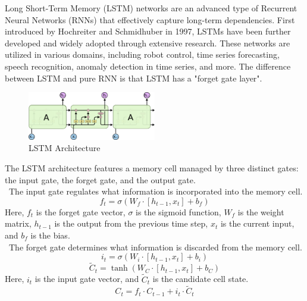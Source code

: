 \documentclass{ieeeojies}
\begin{document}
Long Short-Term Memory (LSTM) networks are an advanced type of Recurrent Neural Networks (RNNs) that effectively capture long-term dependencies. First introduced by Hochreiter and Schmidhuber in 1997, LSTMs have been further developed and widely adopted through extensive research. These networks are utilized in various domains, including robot control, time series forecasting, speech recognition, anomaly detection in time series, and more.
The difference between LSTM and pure RNN is that LSTM has a "forget gate layer". \\

\begin{figure}[H]
    \centering
    \includegraphics[width=0.5\textwidth]{bibliography/Algorithm Structure/LSTM Architecture.png}
    \caption{LSTM Architecture}
    \label{fig:1}
\end{figure}
The LSTM architecture features a memory cell managed by three distinct gates: the input gate, the forget gate, and the output gate. \\
 \indent\textbullet\ The input gate regulates what information is incorporated into the memory cell. \\
 \begin{equation}
    f_t = \sigma(W_f \cdot [h_{t-1}, x_t] + b_f)
 \end{equation}
Here, \( f_t \) is the forget gate vector, \( \sigma \) is the sigmoid function, \( W_f \) is the weight matrix, \( h_{t-1} \) is the output from the previous time step, \( x_t \) is the current input, and \( b_f \) is the bias. \\
 \indent\textbullet\ The forget gate determines what information is discarded from the memory cell. \\
 \begin{equation}
    i_t = \sigma(W_i \cdot [h_{t-1}, x_t] + b_i)
\end{equation}
\begin{equation}
    \tilde{C}_t = \tanh(W_C \cdot [h_{t-1}, x_t] + b_C)
\end{equation}
Here, \( i_t \) is the input gate vector, and \( \tilde{C}_t \) is the candidate cell state. \\
\begin{equation}
    C_t = f_t \cdot C_{t-1} + i_t \cdot \tilde{C}_t
\end{equation}
\end{document}
